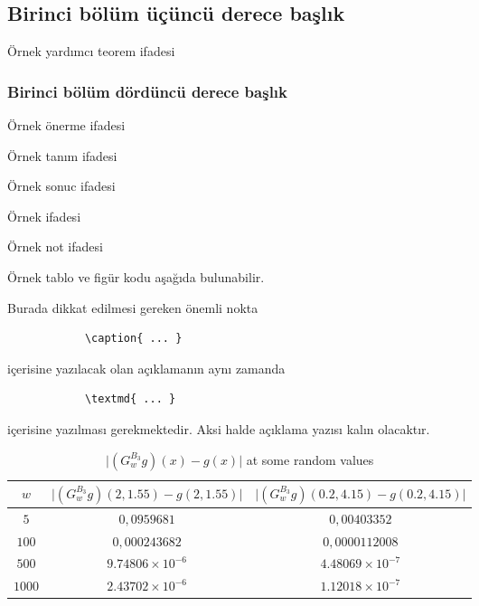 \documentclass[12pt,oneside]{report}
\begin{document}
	\subsection{Birinci bölüm üçüncü derece başlık}
	\begin{lemma}
		Örnek yardımcı teorem ifadesi
	\end{lemma}
		\subsubsection{Birinci bölüm dördüncü derece başlık}
	\begin{proposition}
		Örnek önerme ifadesi
	\end{proposition}
	
	\begin{definition}
		Örnek tanım ifadesi
	\end{definition}
	
	\begin{corollary}
		Örnek sonuc ifadesi
	\end{corollary}
	
	\begin{example}
		Örnek ifadesi
	\end{example}
	
	\begin{remark}
		Örnek not ifadesi
	\end{remark}
	
	
	Örnek tablo ve figür kodu aşağıda bulunabilir. 
	
	\begin{example}
		Burada dikkat edilmesi gereken önemli nokta
		\begin{verbatim}
			\caption{ ... }
		\end{verbatim}
		içerisine yazılacak olan açıklamanın aynı zamanda 
		\begin{verbatim}
			\textmd{ ... }
		\end{verbatim}
		içerisine yazılması gerekmektedir. Aksi halde açıklama yazısı kalın olacaktır. 
		\begin{table}[h]
			\caption{\textmd{$\vert (G_{{w}}^{B_{3}}g)(x)-g(x) \vert$ at some
					random values}}\centering
			\begin{tabular}{c c c}
				\hline
				\textbf{$w$} & \textbf{$\vert (G_{{w}}^{B_{3}}g)(2, 1.55)-g(2, 1.55) \vert$} & 
				\textbf{$\vert (G_{{w}}^{B_{3}}g)(0.2, 4.15)-g(0.2, 4.15) \vert$} \\ \hline
				$ 5 $ & $ 0,0959681 $ & $ 0,00403352 $  \\ 
				$ 100 $ & $ 0,000243682 $ & $ 0,0000112008 $  \\ 
				$ 500 $ & $9.74806\times 10^{-6}$ & $ 4.48069\times 10^{-7}  $ \\ 
				$ 1000 $ & $ 2.43702\times 10^{-6} $ & $ 1.12018\times 10^{-7} $ \\ \hline
			\end{tabular}
			\label{table-g}
		\end{table}
	\end{example}
	
\end{document}
